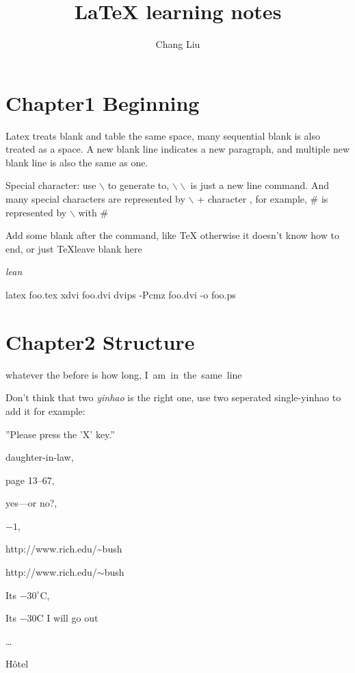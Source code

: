 \documentclass{article}
\title{\LaTeX{} learning notes}
\author{Chang Liu}
\begin{document}
\maketitle


\section{Chapter1 Beginning}
Latex treats blank and table the same space, many sequential blank is also treated as a space.
A new blank line indicates a new paragraph, and multiple new blank line  is also the same as one.


Special character: use $\backslash$ to generate to,  $\backslash\backslash$ is just a new line command. And many
special characters are represented by $\backslash$ + character , for example, \# is represented
by $\backslash$ with \#  

Add some blank after the command, like \TeX{} otherwise it doesn't know how to end, or just \TeX leave blank here


\textsl{lean}
\newline

\begin{comment}
This is a very long commment, however it needs to add packages verbatim
\end{comment}

latex foo.tex %
xdvi foo.dvi %
dvips -Pcmz foo.dvi -o foo.ps %




\section{Chapter2 Structure}


whatever the before is how long, \mbox{I am in the same line}




Don't think that two \textsl{yinhao} is the right one, use two seperated single-yinhao to add it
for example:

''Please press the 'X' key.''

daughter-in-law, 

page 13--67, 

yes---or no?, 

$-1$,

http://www.rich.edu/\~{}bush

http://www.rich.edu/$\sim$bush


Its $-30^{\circ}\mathrm{C}$,

Its $-30\mathrm{C}$
I will go out

\ldots %

H\^otel %
\end{document}
